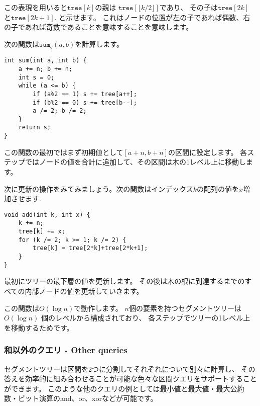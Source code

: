 この表現を用いると$\texttt{tree}[k]$の親は 
$\texttt{tree}[\lfloor k/2 \rfloor]$であり、
その子は$\texttt{tree}[2k]$
と$\texttt{tree}[2k+1]$.
と示せます。
これはノードの位置が左の子であれば偶数、右の子であれば奇数であることを意味することを意味します。

次の関数は$\texttt{sum}_q(a,b)$を計算します。
\begin{lstlisting}
int sum(int a, int b) {
    a += n; b += n;
    int s = 0;
    while (a <= b) {
        if (a%2 == 1) s += tree[a++];
        if (b%2 == 0) s += tree[b--];
        a /= 2; b /= 2;
    }
    return s;
}
\end{lstlisting}
この関数の最初ではまず初期値として$[a+n,b+n]$の区間に設定します。
各ステップではノードの値を合計に追加して、その区間は木の1レベル上に移動します。

次に更新の操作をみてみましょう。次の関数はインデックス$k$の配列の値を$x$増加させます.
\begin{lstlisting}
void add(int k, int x) {
    k += n;
    tree[k] += x;
    for (k /= 2; k >= 1; k /= 2) {
        tree[k] = tree[2*k]+tree[2*k+1];
    }
}
\end{lstlisting}
最初にツリーの最下層の値を更新します。
その後は木の根に到達するまでのすべての内部ノードの値を更新していきます。

この関数は$O(\log n)$で動作します。
$n$個の要素を持つセグメントツリーは$O(\log n)$ 個のレベルから構成されており、
各ステップでツリーの1レベル上を移動するためです。

\subsubsection{和以外のクエリ - Other queries}

セグメントツリーは区間を2つに分割してそれぞれについて別々に計算し、
その答えを効率的に組み合わせることが可能な色々な区間クエリをサポートすることができます。
このような他のクエリの例としては最小値と最大値・最大公約数・ビット演算のand、or、xorなどが可能です。

